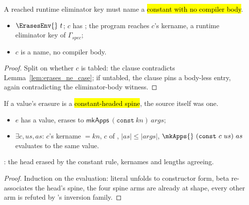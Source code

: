 \begin{lemma}
\label{lem:ErasesEnv-runtimeKey_isCasesOn}
\leanok
{}
 A reached runtime eliminator key must name a \hl{ constant with no compiler
body}.
\begin{itemize}
\item {} $\ErasesEnv{}\ t$; $c$ has ; the program reaches $c$'s kername, a
runtime eliminator key of $\Gamma_{spec}$;
\item {} $c$ is a  name, no compiler body.
\end{itemize}
\end{lemma}
\begin{proof}
\leanok
{}
 Split on whether $c$ is tabled: the  clause contradicts
Lemma~\ref{lem:erases_ne_case}; if untabled, the  clause pins a body-less entry, again
contradicting the eliminator-body witness.
\end{proof}

\begin{lemma}
\label{lem:erases_constSpine_value}
\leanok
{}
 If a value's erasure is a \hl{constant-headed spine}, the source itself was one.
\begin{itemize}
\item {} $e$ has a value, erases to $\mathsf{mkApps}\ (\mathtt{const}\ kn)\ args$;
\item {} $\exists c, us, as$: $c$'s kername $= kn$, $c$ of , $|as|\le|args|$,
$\mkApps{}\ (\mathtt{const}\ c\ us)\ as$ evaluates to the same value.
\end{itemize}
 : the head erased by the constant rule, kernames and lengths
agreeing.
\end{lemma}
\begin{proof}
\leanok
{}
 Induction on the evaluation: literal unfolds to constructor form, beta re-associates the
head's spine, the four spine arms are already at shape, every other arm is refuted by \Erases{}'s
inversion family.
\end{proof}

